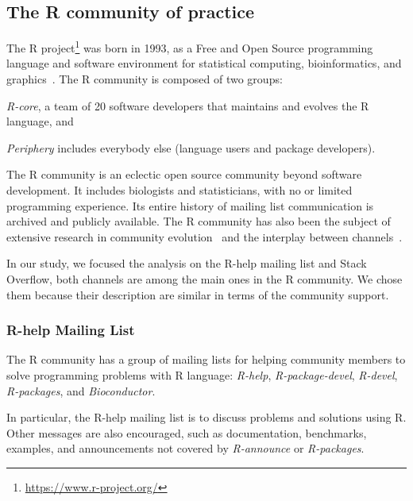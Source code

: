 \subsection{The R community of practice}

    
    The R project\footnote{\url{https://www.r-project.org/}} was born in 1993, as a Free and Open Source programming language and software environment for statistical computing, bioinformatics, and graphics~\cite{Ihaka1996}.
    The R community is composed of two groups:
    \begin{enumerate*}[label=(\arabic*)]
      \item \textit{R-core}, a team of 20 software developers that maintains and evolves the R language, and
      \item \textit{Periphery} includes everybody else (language users and package developers).
    \end{enumerate*}

    The R community is an eclectic open source community beyond software development.
    It includes biologists and statisticians, with no or limited programming experience.
    Its entire history of mailing list communication is archived and publicly available.
    The R community has also been the subject of extensive research in community evolution~\cite{German2013} and the interplay between channels~\cite{Vasilescu2014c}.

    In our study, we focused the analysis on the R-help mailing list and Stack Overflow, both channels are among the main ones in the R community.
    We chose them because their description are similar in terms of the community support.

\subsubsection{R-help Mailing List}
    The R community has a group of mailing lists for helping community members to solve programming problems with R language: \emph{R-help}, \emph{R-package-devel}, \emph{R-devel}, \emph{R-packages}, and \emph{Bioconductor}.

    In particular, the R-help mailing list is to discuss problems and solutions using R. 
    Other messages are also encouraged, such as documentation, benchmarks, examples, and announcements not covered by \emph{R-announce} or \emph{R-packages}.

